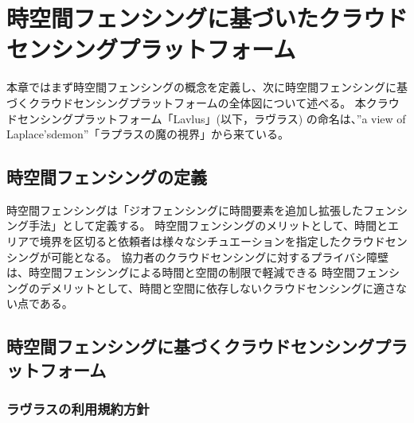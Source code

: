 \chapter{時空間フェンシングに基づいたクラウドセンシングプラットフォーム}
\thispagestyle{myheadings}
本章ではまず時空間フェンシングの概念を定義し、次に時空間フェンシングに基づくクラウドセンシングプラットフォームの全体図について述べる。
本クラウドセンシングプラットフォーム「Lavlus」(以下，ラヴラス) の命名は、”a view of Laplace’sdemon”「ラプラスの魔の視界」から来ている。

\section{時空間フェンシングの定義}
時空間フェンシングは「ジオフェンシングに時間要素を追加し拡張したフェンシング手法」として定義する。
時空間フェンシングのメリットとして、時間とエリアで境界を区切ると依頼者は様々なシチュエーションを指定したクラウドセンシングが可能となる。
協力者のクラウドセンシングに対するプライバシ障壁は、時空間フェンシングによる時間と空間の制限で軽減できる
時空間フェンシングのデメリットとして、時間と空間に依存しないクラウドセンシングに適さない点である。

\section{時空間フェンシングに基づくクラウドセンシングプラットフォーム}
\subsection{ラヴラスの利用規約方針}


